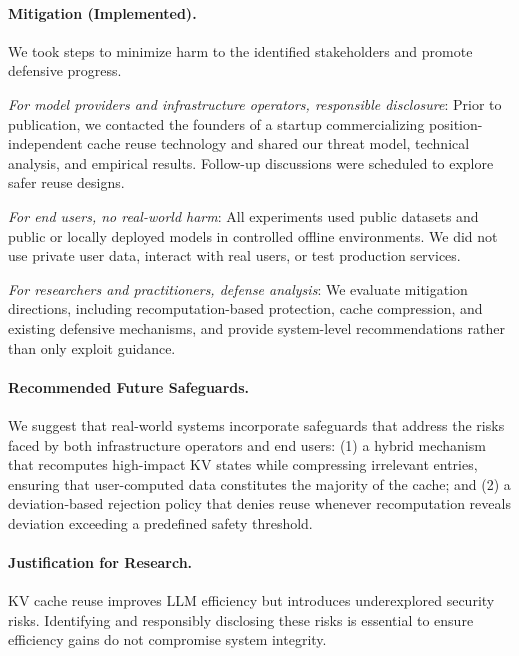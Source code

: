\paragraph{Mitigation (Implemented).}
We took steps to minimize harm to the identified stakeholders and promote defensive progress.
\begin{icompact}
\item \emph{For model providers and infrastructure operators, responsible disclosure}: Prior to publication, we contacted the founders of a startup commercializing position-independent cache reuse technology and shared our threat model, technical analysis, and empirical results. Follow-up discussions were scheduled to explore safer reuse designs.

\item \emph{For end users, no real-world harm}: All experiments used public datasets and public or locally deployed models in controlled offline environments. We did not use private user data, interact with real users, or test production services.

\item \emph{For researchers and practitioners, defense analysis}: We evaluate mitigation directions, including recomputation-based protection, cache compression, and existing defensive mechanisms, and provide system-level recommendations rather than only exploit guidance.
\end{icompact}

\paragraph{Recommended Future Safeguards.}
We suggest that real-world systems incorporate safeguards that address the risks faced by both infrastructure operators and end users: (1) a hybrid mechanism that recomputes high-impact KV states while compressing irrelevant entries, ensuring that user-computed data constitutes the majority of the cache; and (2) a deviation-based rejection policy that denies reuse whenever recomputation reveals deviation exceeding a predefined safety threshold.

\paragraph{Justification for Research.}
KV cache reuse improves LLM efficiency but introduces underexplored security risks. Identifying and responsibly disclosing these risks is essential to ensure efficiency gains do not compromise system integrity.

